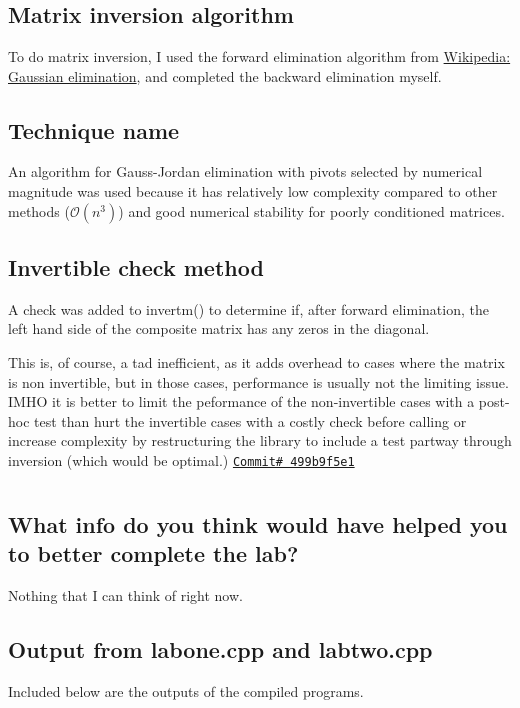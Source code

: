 \documentclass{article}
\begin{document}
\section{}
\subsection{Matrix inversion algorithm}
To do matrix inversion, I used the forward elimination algorithm from  \href{https://en.wikipedia.org/wiki/Gaussian_elimination#Pseudocode}{Wikipedia: Gaussian elimination}, and completed the backward elimination myself.
\subsection{Technique name}
An algorithm for Gauss-Jordan elimination with pivots selected by numerical magnitude was used because it has relatively low complexity compared to other methods ($\mathcal{O}(n^3)$) and good numerical stability for poorly conditioned matrices.
\subsection{Invertible check method}
A check was added to invertm() to determine if, after forward elimination, the left hand side of the composite matrix has any zeros in the diagonal.

This is, of course, a tad inefficient, as it adds overhead to cases where the matrix is non invertible, but in those cases, performance is usually not the limiting issue. IMHO it is better to limit the peformance of the non-invertible cases with a post-hoc test than hurt the invertible cases with a costly check before calling or increase complexity by restructuring the library to include a test partway through inversion (which would be optimal.) \href{https://github.com/tymo77/smart-products/commit/499b9f5e1da824d2720f8168dcaf1bd210213484}{\texttt{Commit\# 499b9f5e1}}

\section{}
\subsection{What info do you think would have helped you to better complete the lab?}
Nothing that I can think of right now.

\subsection{Output from labone.cpp and labtwo.cpp}
Included below are the outputs of the compiled programs.
\end{document}
